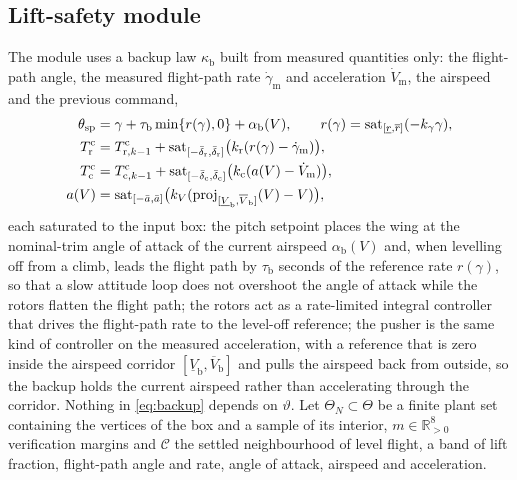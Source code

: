 \documentclass[final,5p,times,twocolumn]{elsarticle}
\begin{document}
\subsection{Lift-safety module}\label{sec:lsm}
The module uses a backup law $\kappa_{\mathrm b}$ built from measured quantities only: the flight-path angle, the measured flight-path rate $\dot\gamma_{\mathrm m}$ and acceleration $\dot V_{\mathrm m}$, the airspeed and the previous command,
\begin{subequations}\label{eq:backup}
\begin{align}
\theta_{\mathrm{sp}}&=\gamma+\tau_{\mathrm b}\min\{r(\gamma),0\}+\alpha_{\mathrm b}(V),\qquad r(\gamma)=\mathrm{sat}_{[\underline r,\overline r]}(-k_\gamma\gamma),\label{eq:bk_th}\\
T^{\mathrm c}_{\mathrm r}&=T^{\mathrm c}_{\mathrm r,k-1}+\mathrm{sat}_{[-\bar\delta_{\mathrm r},\bar\delta_{\mathrm r}]}\big(k_{\mathrm r}(r(\gamma)-\dot\gamma_{\mathrm m})\big),\label{eq:bk_r}\\
T^{\mathrm c}_{\mathrm c}&=T^{\mathrm c}_{\mathrm c,k-1}+\mathrm{sat}_{[-\bar\delta_{\mathrm c},\bar\delta_{\mathrm c}]}\big(k_{\mathrm c}(a(V)-\dot V_{\mathrm m})\big),\label{eq:bk_c}\\
a(V)&=\mathrm{sat}_{[-\bar a,\bar a]}\big(k_V(\mathrm{proj}_{[\underline V_{\mathrm b},\overline V_{\mathrm b}]}(V)-V)\big),\nonumber
\end{align}
\end{subequations}
each saturated to the input box: the pitch setpoint places the wing at the nominal-trim angle of attack of the current airspeed $\alpha_{\mathrm b}(V)$ and, when levelling off from a climb, leads the flight path by $\tau_{\mathrm b}$ seconds of the reference rate $r(\gamma)$, so that a slow attitude loop does not overshoot the angle of attack while the rotors flatten the flight path; the rotors act as a rate-limited integral controller that drives the flight-path rate to the level-off reference; the pusher is the same kind of controller on the measured acceleration, with a reference that is zero inside the airspeed corridor $[\underline V_{\mathrm b},\overline V_{\mathrm b}]$ and pulls the airspeed back from outside, so the backup holds the current airspeed rather than accelerating through the corridor. Nothing in \eqref{eq:backup} depends on $\vartheta$. Let $\Theta_N\subset\Theta$ be a finite plant set containing the vertices of the box and a sample of its interior, $m\in\mathbb R^8_{>0}$ verification margins and $\mathcal C$ the settled neighbourhood of level flight, a band of lift fraction, flight-path angle and rate, angle of attack, airspeed and acceleration.
\end{document}
